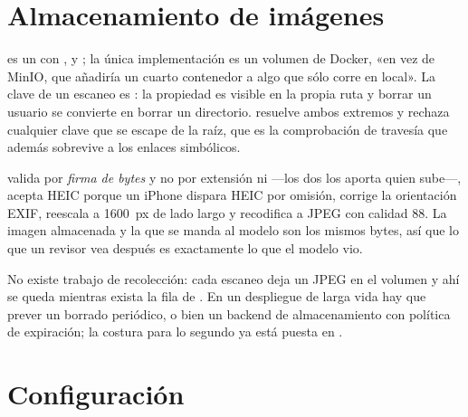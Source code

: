 \section{Almacenamiento de imágenes}

 es un  con ,  y
; la única implementación es un volumen de Docker, «en vez de
MinIO, que añadiría un cuarto contenedor a algo que sólo corre en local». La
clave de un escaneo es : la propiedad es
visible en la propia ruta y borrar un usuario se convierte en borrar un
directorio.  resuelve ambos extremos y rechaza cualquier clave
que se escape de la raíz, que es la comprobación de travesía que además
sobrevive a los enlaces simbólicos.

 valida por \emph{firma de bytes} y no por extensión
ni  —los dos los aporta quien sube—, acepta HEIC porque un
iPhone dispara HEIC por omisión, corrige la orientación EXIF, reescala a
1600~px de lado largo y recodifica a JPEG con calidad 88. La imagen almacenada y
la que se manda al modelo son los mismos bytes, así que lo que un revisor vea
después es exactamente lo que el modelo vio.

\begin{pkwarn}
No existe trabajo de recolección: cada escaneo deja un JPEG en el volumen y ahí
se queda mientras exista la fila de . En un despliegue de larga
vida hay que prever un borrado periódico, o bien un backend de almacenamiento
con política de expiración; la costura para lo segundo ya está puesta en
.
\end{pkwarn}

\section{Configuración}

